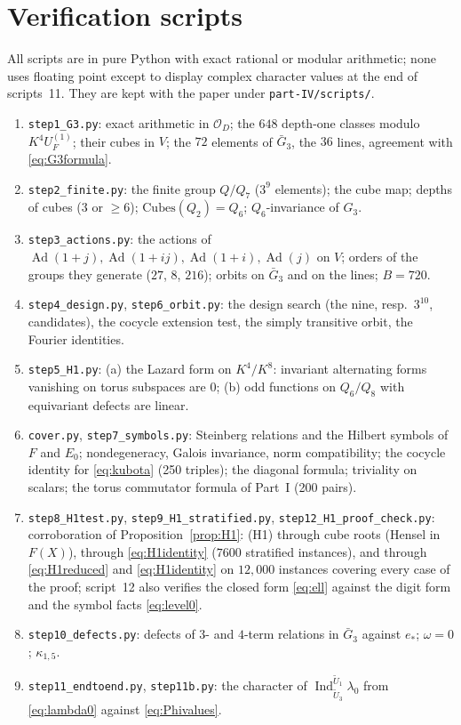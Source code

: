 \documentclass[11pt]{article}
\newcommand{\Ind}{\operatorname{Ind}}
\newcommand{\Ad}{\operatorname{Ad}}
\newcommand{\tU}{\widetilde U}
\newcommand{\Ocal}{\mathcal O}
\newcommand{\Cubes}{\mathrm{Cubes}}
\theoremstyle{plain}
\theoremstyle{definition}
\begin{document}
\section{Verification scripts}\label{app:scripts}
All scripts are in pure Python with exact rational or modular
arithmetic; none uses floating point except to display complex
character values at the end of scripts~11.  They are kept with the
paper under \texttt{part-IV/scripts/}.
\begin{enumerate}[label=\arabic*.]
\item \texttt{step1\_G3.py}: exact arithmetic in $\Ocal_D$; the $648$
depth-one classes modulo $K^4U_F^{(1)}$; their cubes in $V$; the $72$
elements of $\bar G_3$, the $36$ lines, agreement with \eqref{eq:G3formula}.
\item \texttt{step2\_finite.py}: the finite group $Q/Q_7$ ($3^9$
elements); the cube map; depths of cubes ($3$ or $\ge6$);
$\Cubes(Q_2)=Q_6$; $Q_6$-invariance of $G_3$.
\item \texttt{step3\_actions.py}: the actions of $\Ad(1+j),\Ad(1+ij),\Ad(1+i),\Ad(j)$
on $V$; orders of the groups they generate ($27$, $8$, $216$); orbits on
$\bar G_3$ and on the lines; $B=720$.
\item \texttt{step4\_design.py}, \texttt{step6\_orbit.py}: the design
search (the nine, resp.\ $3^{10}$, candidates), the cocycle extension
test, the simply transitive orbit, the Fourier identities.
\item \texttt{step5\_H1.py}: (a) the Lazard form on $K^4/K^8$:
invariant alternating forms vanishing on torus subspaces are $0$;
(b) odd functions on $Q_6/Q_8$ with equivariant defects are linear.
\item \texttt{cover.py}, \texttt{step7\_symbols.py}: Steinberg
relations and the Hilbert symbols of $F$ and $E_0$; nondegeneracy,
Galois invariance, norm compatibility; the cocycle identity for
\eqref{eq:kubota} (250 triples); the diagonal formula; triviality on
scalars; the torus commutator formula of Part~I (200 pairs).
\item \texttt{step8\_H1test.py}, \texttt{step9\_H1\_stratified.py},
\texttt{step12\_H1\_proof\_check.py}: corroboration of
Proposition~\ref{prop:H1}: (H1) through cube roots (Hensel in $F(X)$),
through \eqref{eq:H1identity} ($7600$ stratified instances), and
through \eqref{eq:H1reduced} and \eqref{eq:H1identity} on $12{,}000$
instances covering every case of the proof; script~12 also verifies the
closed form \eqref{eq:ell} against the digit form and the symbol facts
\eqref{eq:level0}.
\item \texttt{step10\_defects.py}: defects of $3$- and $4$-term
relations in $\bar G_3$ against $e_*$; $\omega=0$; $\kappa_{1,5}$.
\item \texttt{step11\_endtoend.py}, \texttt{step11b.py}: the character
of $\Ind_{\tU_3}^{\tU_1}\lambda_0$ from \eqref{eq:lambda0} against
\eqref{eq:Phivalues}.
\end{enumerate}
\end{document}
